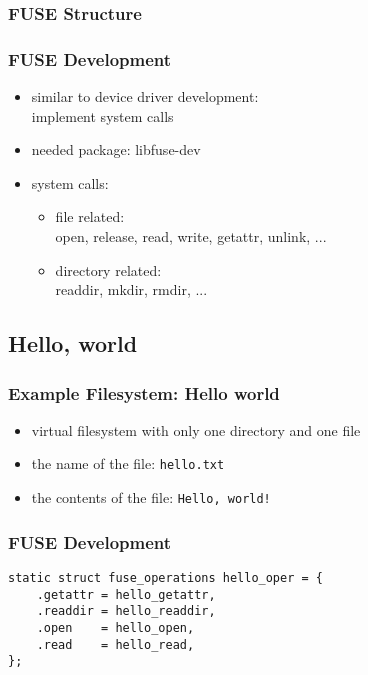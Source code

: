 \documentclass[dvipsnames]{beamer}
\begin{document}
\begin{frame}
  \frametitle{FUSE Structure}

  \begin{center}
  \end{center}
\end{frame}

\begin{frame}
  \frametitle{FUSE Development}

  \begin{itemize}
    \item similar to device driver development:\\
      implement system calls
    \item needed package: libfuse-dev

    \pause
    \item system calls:
    \begin{itemize}
      \item file related:\\
        open, release, read, write, getattr, unlink, ...
      \item directory related:\\
        readdir, mkdir, rmdir, ...
    \end{itemize}
  \end{itemize}
\end{frame}

\subsection{Hello, world}

\begin{frame}
  \frametitle{Example Filesystem: Hello world}

  \begin{itemize}
    \item virtual filesystem with only one directory and one file
    \item the name of the file: \texttt{hello.txt}
    \item the contents of the file: \texttt{Hello, world!}
  \end{itemize}
\end{frame}

\begin{frame}[fragile]
  \frametitle{FUSE Development}

  \begin{example}
    \begin{lstlisting}
static struct fuse_operations hello_oper = {
    .getattr = hello_getattr,
    .readdir = hello_readdir,
    .open    = hello_open,
    .read    = hello_read,
};
    \end{lstlisting}
  \end{example}
\end{frame}
\end{document}
